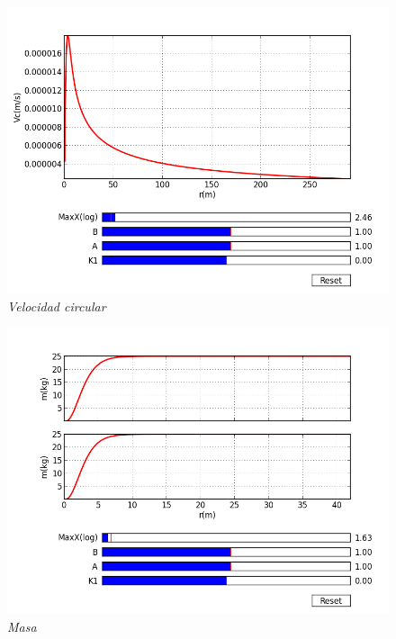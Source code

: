 \documentclass[12pt]{book}
\begin{document}
\begin{itemize}
\begin{figure}[!ht]
 \centering
 \includegraphics[scale=0.33]{pt_vc_A1_B1.png}
 \caption{\emph{Velocidad circular}}
\end{figure}

\begin{figure}[!ht]
 \centering
 \includegraphics[scale=0.33]{pt_m_compAn.png}
 \caption{\emph{Masa}}
\end{figure}


\end{itemize}
\end{document}

